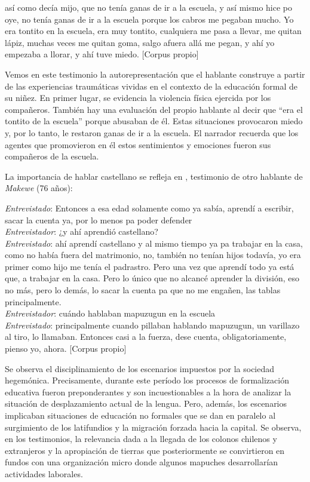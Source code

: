 \documentclass[output=paper]{../langscibook}
\begin{document}
\ea\label{ex:olate:4}
    así como decía mijo, que no tenía ganas de ir a la escuela, y así mismo hice po oye, no tenía ganas de ir a la escuela porque los cabros me pegaban mucho. Yo era tontito en la escuela, era muy tontito, cualquiera me pasa a llevar, me quitan lápiz, muchas veces me quitan goma, salgo afuera allá me pegan, y ahí yo empezaba a llorar, y ahí tuve miedo. \textup{[Corpus propio]}
\z


Vemos en este testimonio la autorepresentación que el hablante construye a partir de las experiencias traumáticas vividas en el contexto de la educación formal de su niñez. En primer lugar, se evidencia la violencia física ejercida por los compañeros. También hay una evaluación del propio hablante al decir que “era el tontito de la escuela” porque abusaban de él. Estas situaciones provocaron miedo y, por lo tanto, le restaron ganas de ir a la escuela. El narrador recuerda que los agentes que promovieron en él estos sentimientos y emociones fueron sus compañeros de la escuela.

La importancia de hablar castellano se refleja en , testimonio de otro hablante de \textit{Makewe} (76 años):


\ea\label{ex:olate:5}
 \emph{Entrevistado}: Entonces a esa edad solamente como ya sabía, aprendí a escribir, sacar la cuenta ya, por lo menos pa poder defender\\
 \emph{Entrevistador}: ¿y ahí aprendió castellano? \\
 \emph{Entrevistado}: ahí aprendí castellano y al mismo tiempo ya pa trabajar en la casa, como no había fuera del matrimonio, no, también no tenían hijos todavía, yo era primer como hijo me tenía el padrastro. Pero una vez que aprendí todo ya está que, a trabajar en la casa. Pero lo único que no alcancé aprender la división, eso no más, pero lo demás, lo sacar la cuenta pa que no me engañen, las tablas principalmente.\\
 \emph{Entrevistador}: cuándo hablaban mapuzugun en la escuela\\
 \emph{Entrevistado}: principalmente cuando pillaban hablando mapuzugun, un varillazo al tiro, lo llamaban. Entonces casi a la fuerza, dese cuenta, obligatoriamente, pienso yo, ahora. \textup{[Corpus propio]}\\
\z

Se observa el disciplinamiento de los escenarios impuestos por la sociedad hegemónica. Precisamente, durante este período los procesos de formalización educativa fueron preponderantes y son incuestionables a la hora de analizar la situación de desplazamiento actual de la lengua. Pero, además, los escenarios implicaban situaciones de educación no formales que se dan en paralelo al surgimiento de los latifundios y la migración forzada hacia la capital. Se observa, en los testimonios, la relevancia dada a la llegada de los colonos chilenos y extranjeros y la apropiación de tierras que posteriormente se convirtieron en fundos con una organización micro donde algunos mapuches desarrollarían actividades laborales.
\end{document}
